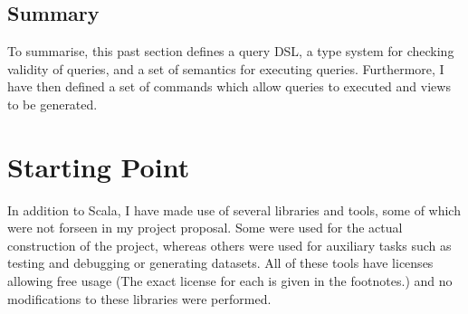 \documentclass[12pt,a4paper,twoside,openright]{report}
\begin{document}
\subsection{Summary}
To summarise, this past section defines a query DSL, a type system for checking validity of queries, and a set of semantics for executing queries. Furthermore, I have then defined a set of commands which allow queries to executed and views to be generated.


\section{Starting Point}
In addition to Scala, I have made use of several libraries and tools, some of which were not forseen in my project proposal. Some were used for the actual construction of the project, whereas others were used for auxiliary tasks such as testing and debugging or  generating datasets. All of these tools have licenses allowing free usage (The exact license for each is given in the footnotes.) and no modifications to these libraries were performed.
\end{document}
